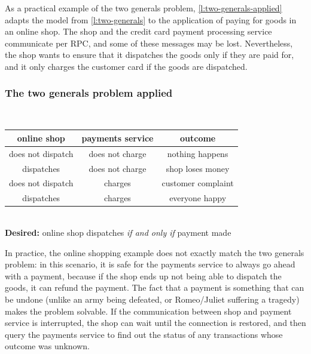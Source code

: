 As a practical example of the two generals problem, \autoref{l:two-generals-applied} adapts the model from \autoref{l:two-generals} to the application of paying for goods in an online shop.
The shop and the credit card payment processing service communicate per RPC, and some of these messages may be lost.
Nevertheless, the shop wants to ensure that it dispatches the goods only if they are paid for, and it only charges the customer card if the goods are dispatched.

\begin{frame}
    \label{s:two-generals-applied}
    \frametitle{The two generals problem applied}
    \begin{center}
        \\[0.5em]\pause
        \renewcommand{\arraystretch}{1.3}
        \begin{tabular}{c|c|c}
            \hline
            \textbf{online shop} & \textbf{payments service} & \textbf{outcome} \\\hline
            does not dispatch & does not charge & nothing happens \\
            dispatches & does not charge & shop loses money \\
            does not dispatch & charges & customer complaint \\
            dispatches & charges & everyone happy \\\hline
        \end{tabular}\\[1em]
        \textbf{Desired:} online shop dispatches \emph{if and only if} payment made
    \end{center}
\end{frame}
\label{l:two-generals-applied}

In practice, the online shopping example does not exactly match the two generals problem: in this scenario, it is safe for the payments service to always go ahead with a payment, because if the shop ends up not being able to dispatch the goods, it can refund the payment.
The fact that a payment is something that can be undone (unlike an army being defeated, or Romeo/Juliet suffering a tragedy) makes the problem solvable.
If the communication between shop and payment service is interrupted, the shop can wait until the connection is restored, and then query the payments service to find out the status of any transactions whose outcome was unknown.

